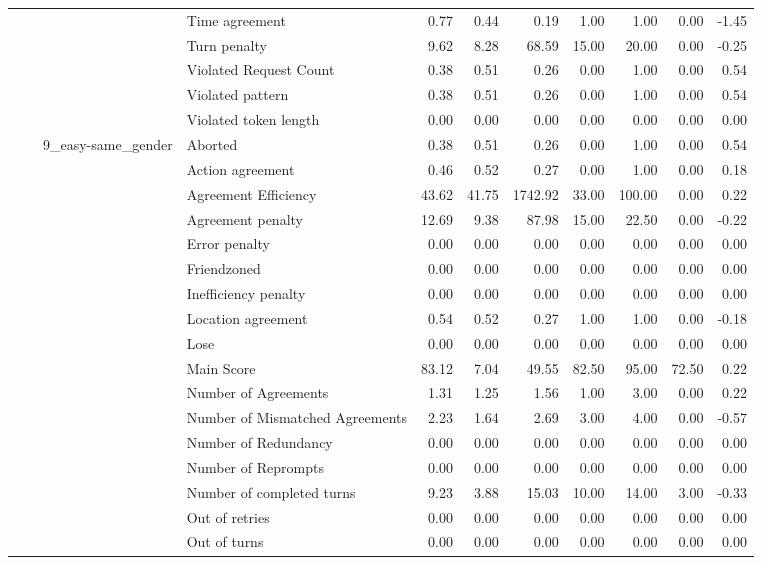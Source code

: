 \begin{tabular}{llllrrrrrrr}
 &  &  & Time agreement & 0.77 & 0.44 & 0.19 & 1.00 & 1.00 & 0.00 & -1.45 \\
 &  &  & Turn penalty & 9.62 & 8.28 & 68.59 & 15.00 & 20.00 & 0.00 & -0.25 \\
 &  &  & Violated Request Count & 0.38 & 0.51 & 0.26 & 0.00 & 1.00 & 0.00 & 0.54 \\
 &  &  & Violated pattern & 0.38 & 0.51 & 0.26 & 0.00 & 1.00 & 0.00 & 0.54 \\
 &  &  & Violated token length & 0.00 & 0.00 & 0.00 & 0.00 & 0.00 & 0.00 & 0.00 \\
\cline{3-11}
 &  & \multirow[t]{27}{*}{9_easy-same_gender} & Aborted & 0.38 & 0.51 & 0.26 & 0.00 & 1.00 & 0.00 & 0.54 \\
 &  &  & Action agreement & 0.46 & 0.52 & 0.27 & 0.00 & 1.00 & 0.00 & 0.18 \\
 &  &  & Agreement Efficiency & 43.62 & 41.75 & 1742.92 & 33.00 & 100.00 & 0.00 & 0.22 \\
 &  &  & Agreement penalty & 12.69 & 9.38 & 87.98 & 15.00 & 22.50 & 0.00 & -0.22 \\
 &  &  & Error penalty & 0.00 & 0.00 & 0.00 & 0.00 & 0.00 & 0.00 & 0.00 \\
 &  &  & Friendzoned & 0.00 & 0.00 & 0.00 & 0.00 & 0.00 & 0.00 & 0.00 \\
 &  &  & Inefficiency penalty & 0.00 & 0.00 & 0.00 & 0.00 & 0.00 & 0.00 & 0.00 \\
 &  &  & Location agreement & 0.54 & 0.52 & 0.27 & 1.00 & 1.00 & 0.00 & -0.18 \\
 &  &  & Lose & 0.00 & 0.00 & 0.00 & 0.00 & 0.00 & 0.00 & 0.00 \\
 &  &  & Main Score & 83.12 & 7.04 & 49.55 & 82.50 & 95.00 & 72.50 & 0.22 \\
 &  &  & Number of Agreements & 1.31 & 1.25 & 1.56 & 1.00 & 3.00 & 0.00 & 0.22 \\
 &  &  & Number of Mismatched Agreements & 2.23 & 1.64 & 2.69 & 3.00 & 4.00 & 0.00 & -0.57 \\
 &  &  & Number of Redundancy & 0.00 & 0.00 & 0.00 & 0.00 & 0.00 & 0.00 & 0.00 \\
 &  &  & Number of Reprompts & 0.00 & 0.00 & 0.00 & 0.00 & 0.00 & 0.00 & 0.00 \\
 &  &  & Number of completed turns & 9.23 & 3.88 & 15.03 & 10.00 & 14.00 & 3.00 & -0.33 \\
 &  &  & Out of retries & 0.00 & 0.00 & 0.00 & 0.00 & 0.00 & 0.00 & 0.00 \\
 &  &  & Out of turns & 0.00 & 0.00 & 0.00 & 0.00 & 0.00 & 0.00 & 0.00 \\

\end{tabular}
